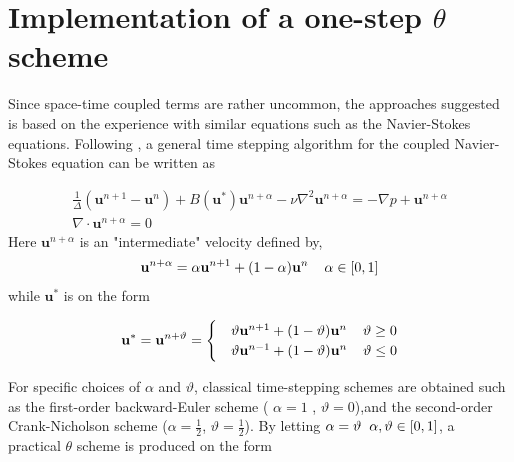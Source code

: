 \section{Implementation of a one-step $\theta$ scheme} 
Since space-time coupled terms are rather uncommon, the approaches suggested is based on the experience with similar equations such as the Navier-Stokes equations. Following \cite{Simo1994},  a general time stepping algorithm for the coupled Navier-Stokes equation can be written as

\begin{align*}
\frac{1}{\Delta}(\mathbf{u}^{n+1} - \mathbf{u}^{n}) + 
B(\mathbf{u}^{*})\mathbf{u}^{n+\alpha}
- \nu \nabla^2 \mathbf{u}^{n + \alpha} = - \nabla p + \mathbf{u}^{n+\alpha} \\
\nabla \cdot \mathbf{u}^{n+\alpha} = 0 
\end{align*} 
Here $\mathbf{u}^{n+\alpha}$ is an "intermediate" velocity defined by,
\begin{align*}
\mathbf{u}^{n+\alpha} = \alpha\mathbf{u}^{n+1} + (1 - \alpha)\mathbf{u}^{n} 
\hspace{4mm} \alpha \in [0, 1]
\end{align*}
while $\mathbf{u}^{*}$ is on the form

\begin{align*}
\mathbf{u}^{*} =   \mathbf{u}^{n+ \vartheta} =
\begin{cases} 
   &\vartheta \mathbf{u}^{n+1} + (1 - \vartheta)\mathbf{u}^{n} \hspace{4mm} \vartheta \geq 0 \\ 
   &\vartheta \mathbf{u}^{n-1} + (1 - \vartheta)\mathbf{u}^{n} \hspace{4mm} \vartheta \leq 0
   \end{cases}
\end{align*}

For specific choices of $\alpha$ and $\vartheta$, classical time-stepping schemes are obtained such as the  first-order backward-Euler scheme ( $\alpha = 1$ , $\vartheta = 0$),and the second-order Crank-Nicholson scheme ($\alpha = \frac{1}{2}$,  $\vartheta = \frac{1}{2}$). By letting $\alpha = \vartheta \hspace{2mm} \alpha, \vartheta \in [0, 1] $, a practical $\theta$ scheme is produced on the form

